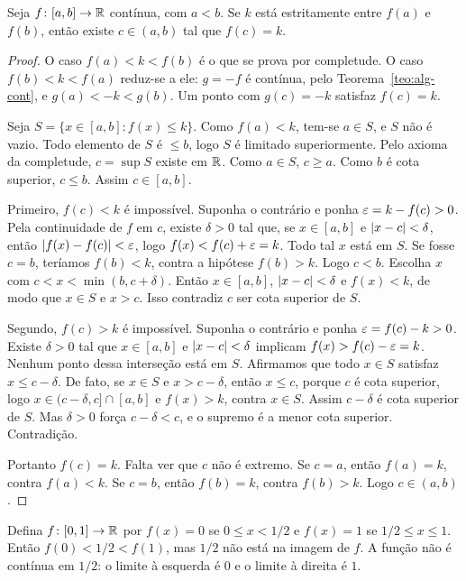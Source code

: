 \documentclass[11pt,a4paper]{article}
\begin{document}
\begin{teorema}
\label{teo:tvi}
Seja $f\colon[a,b]\to\mathbb{R}$ cont\'inua, com $a<b$. Se $k$ est\'a estritamente entre $f(a)$ e $f(b)$, ent\~ao existe $c\in(a,b)$ tal que $f(c)=k$.
\end{teorema}

\begin{proof}
O caso $f(a)<k<f(b)$ \'e o que se prova por completude. O caso $f(b)<k<f(a)$ reduz-se a ele: $g=-f$ \'e cont\'inua, pelo Teorema~\ref{teo:alg-cont}, e $g(a)< -k< g(b)$. Um ponto com $g(c)=-k$ satisfaz $f(c)=k$.

Seja $S=\{x\in[a,b]: f(x)\le k\}$. Como $f(a)<k$, tem-se $a\in S$, e $S$ n\~ao \'e vazio. Todo elemento de $S$ \'e $\le b$, logo $S$ \'e limitado superiormente. Pelo axioma da completude, $c=\sup S$ existe em $\mathbb{R}$. Como $a\in S$, $c\ge a$. Como $b$ \'e cota superior, $c\le b$. Assim $c\in[a,b]$.

Primeiro, $f(c)<k$ \'e imposs\'ivel. Suponha o contr\'ario e ponha $\varepsilon=k-f(c)>0$. Pela continuidade de $f$ em $c$, existe $\delta>0$ tal que, se $x\in[a,b]$ e $\left\lvert x-c \right\rvert<\delta$, ent\~ao $\left\lvert f(x)-f(c) \right\rvert<\varepsilon$, logo $f(x)<f(c)+\varepsilon=k$. Todo tal $x$ est\'a em $S$. Se fosse $c=b$, ter\'iamos $f(b)<k$, contra a hip\'otese $f(b)>k$. Logo $c<b$. Escolha $x$ com $c<x<\min(b,c+\delta)$. Ent\~ao $x\in[a,b]$, $\left\lvert x-c \right\rvert<\delta$ e $f(x)<k$, de modo que $x\in S$ e $x>c$. Isso contradiz $c$ ser cota superior de $S$.

Segundo, $f(c)>k$ \'e imposs\'ivel. Suponha o contr\'ario e ponha $\varepsilon=f(c)-k>0$. Existe $\delta>0$ tal que $x\in[a,b]$ e $\left\lvert x-c \right\rvert<\delta$ implicam $f(x)>f(c)-\varepsilon=k$. Nenhum ponto dessa interse\c{c}\~ao est\'a em $S$. Afirmamos que todo $x\in S$ satisfaz $x\le c-\delta$. De fato, se $x\in S$ e $x>c-\delta$, ent\~ao $x\le c$, porque $c$ \'e cota superior, logo $x\in(c-\delta,c]\cap[a,b]$ e $f(x)>k$, contra $x\in S$. Assim $c-\delta$ \'e cota superior de $S$. Mas $\delta>0$ for\c{c}a $c-\delta<c$, e o supremo \'e a menor cota superior. Contradi\c{c}\~ao.

Portanto $f(c)=k$. Falta ver que $c$ n\~ao \'e extremo. Se $c=a$, ent\~ao $f(a)=k$, contra $f(a)<k$. Se $c=b$, ent\~ao $f(b)=k$, contra $f(b)>k$. Logo $c\in(a,b)$.
\end{proof}

\begin{proposicao}
\label{prop:degrau}
Defina $f\colon[0,1]\to\mathbb{R}$ por $f(x)=0$ se $0\le x<1/2$ e $f(x)=1$ se $1/2\le x\le 1$. Ent\~ao $f(0)<1/2<f(1)$, mas $1/2$ n\~ao est\'a na imagem de $f$. A fun\c{c}\~ao n\~ao \'e cont\'inua em $1/2$: o limite \`a esquerda \'e $0$ e o limite \`a direita \'e $1$.
\end{proposicao}
\end{document}
